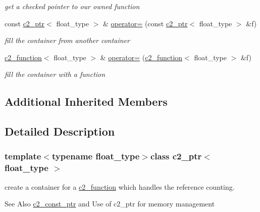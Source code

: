 \begin{DoxyCompactItemize}
\begin{DoxyCompactList}\small\item\em get a checked pointer to our owned function \end{DoxyCompactList}\item 
const \hyperlink{classc2__ptr}{c2\-\_\-ptr}$<$ float\-\_\-type $>$ \& \hyperlink{classc2__ptr_ab176b3afe89de4456f3a4236cbf09008}{operator=} (const \hyperlink{classc2__ptr}{c2\-\_\-ptr}$<$ float\-\_\-type $>$ \&f)
\begin{DoxyCompactList}\small\item\em fill the container from another container \end{DoxyCompactList}\item 
\hyperlink{classc2__function}{c2\-\_\-function}$<$ float\-\_\-type $>$ \& \hyperlink{classc2__ptr_a7174f58864fa8e3439b6cfac256a1096}{operator=} (\hyperlink{classc2__function}{c2\-\_\-function}$<$ float\-\_\-type $>$ \&f)
\begin{DoxyCompactList}\small\item\em fill the container with a function \end{DoxyCompactList}\end{DoxyCompactItemize}
\subsection*{Additional Inherited Members}


\subsection{Detailed Description}
\subsubsection*{template$<$typename float\-\_\-type$>$class c2\-\_\-ptr$<$ float\-\_\-type $>$}

create a container for a \hyperlink{classc2__function}{c2\-\_\-function} which handles the reference counting. 

\begin{DoxySeeAlso}{See Also}
\hyperlink{classc2__const__ptr}{c2\-\_\-const\-\_\-ptr} and Use of c2\-\_\-ptr for memory management 
\end{DoxySeeAlso}


